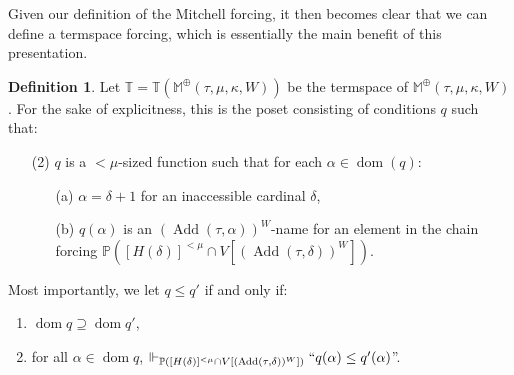 \documentclass[a4paper]{amsart}
\theoremstyle{definition}
\newtheorem{mydef}{Definition}[section]
\theoremstyle{remark}
\theoremstyle{plain}
\numberwithin{mydef}{section}
\DeclareMathOperator{\dom}{dom}
\DeclareMathOperator{\Add}{Add}
\newcommand{\dM}{\mathbb{M}}
\newcommand{\dP}{\mathbb{P}}
\newcommand{\dT}{\mathbb{T}}
\begin{document}
		 Given our definition of the Mitchell forcing, it then becomes clear that we can define a termspace forcing, which is essentially the main benefit of this presentation.


	
\begin{mydef} Let $\dT=\dT(\dM^\oplus(\tau,\mu,\kappa,W))$ be the termspace of $\dM^\oplus(\tau,\mu,\kappa,W)$. For the sake of explicitness, this is the poset consisting of conditions $q$ such that:

\begin{enumerate}

\item[(2)] $q$ is a $<\mu$-sized function such that for each $\alpha\in\dom(q)$:

\begin{itemize}
\item[(a)] $\alpha=\delta+1$ for an inaccessible cardinal $\delta$,
\item[(b)] $q(\alpha)$ is an $(\Add(\tau,\alpha))^W$-name for an element in the chain forcing $\dP([H(\delta)]^{<\mu}\cap V[(\Add(\tau,\delta))^W])$.
\end{itemize}


\end{enumerate}

Most importantly, we let $q \le q'$ if and only if:

\begin{enumerate}

\item $\dom q \supseteq \dom q'$,

\item for all $\alpha \in \dom q$, $\Vdash_{\dP([H(\delta)]^{<\mu}\cap V[(\Add(\tau,\delta))^W])} ``q(\alpha) \le q'(\alpha)$''.

\end{enumerate}
\end{mydef}




	


\end{document}
